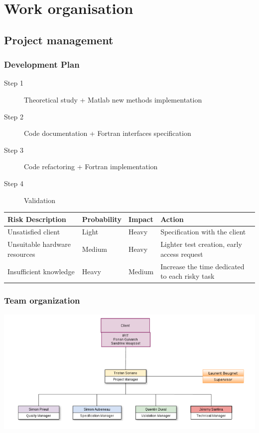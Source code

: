 \documentclass[10p]{beamer}
\begin{document}
\section{Work organisation}
\subsection{Project management}
\begin{frame}
\small
\frametitle{Development Plan}
\begin{description}
\item [Step 1] Theoretical study + Matlab new methods implementation
\item [Step 2] Code documentation + Fortran interfaces specification
\item [Step 3] Code refactoring + Fortran implementation
\item [Step 4] Validation
\end{description}
\tiny
\begin{tabular}{|l|l|l|l|}
\hline
\textbf{Risk Description} & \textbf{Probability} & \textbf{Impact} & \textbf{Action}
\\
\hline
Unsatisfied client & Light & Heavy & Specification with the client
\\
\hline
Unsuitable hardware resources & Medium & Heavy & Lighter test creation, early access request
\\
\hline
Insufficient knowledge & Heavy & Medium & Increase the time dedicated to each risky task
\\
\hline
\end{tabular}
\end{frame}
\begin{frame}
\frametitle{Team organization}
\includegraphics[width=\textwidth]{Image/organisation.png}
\end{frame}
\end{document}

